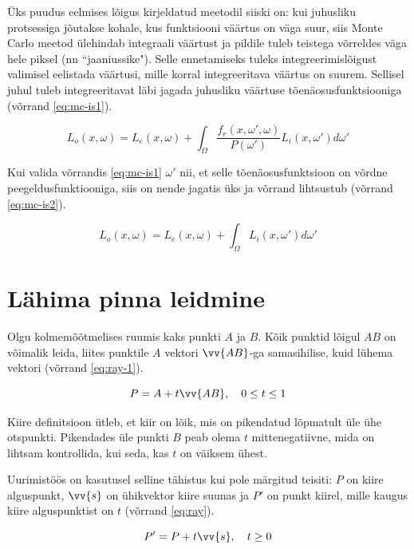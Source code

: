 \documentclass[a4paper,12pt]{report}
\renewcommand{\vec}[1]{\vv{#1}}
\begin{document}
Üks puudus eelmises lõigus kirjeldatud meetodil siiski on: kui juhusliku
protsessiga jõutakse kohale, kus funktsiooni väärtus on väga suur, siis
Monte Carlo meetod ülehindab integraali väärtust ja pildile tuleb teistega
võrreldes väga hele piksel (nn ``jaaniussike"). Selle ennetamiseks tuleks
integreerimislõigust valimisel eelistada väärtusi, mille korral
integreeritava väärtus on suurem. Sellisel juhul tuleb integreeritavat
läbi jagada juhusliku väärtuse tõenäosusfunktsiooniga (võrrand \ref{eq:mc-is1}).

\begin{equation} \label{eq:mc-is1}
L_o(x, \omega) = L_e(x, \omega) + \int_\Omega \frac{f_r(x, \omega', \omega)}{P(\omega')} L_i(x, \omega') d\omega'
\end{equation}

Kui valida võrrandis \ref{eq:mc-is1} \(\omega'\) nii, et selle
tõenäosusfunktsioon on võrdne peegeldusfunktiooniga, siis on nende
jagatis üks ja võrrand lihtsustub (võrrand \ref{eq:mc-is2}).

\begin{equation} \label{eq:mc-is2}
L_o(x, \omega) = L_e(x, \omega) + \int_\Omega L_i(x, \omega') d\omega'
\end{equation}

\section{Lähima pinna leidmine}
Olgu kolmemõõtmelises ruumis kaks punkti \(A\) ja \(B\). Kõik punktid
lõigul \(AB\) on võimalik leida, liites punktile \(A\) vektori \(\vec{AB}\)-ga
samasihilise, kuid lühema vektori (võrrand \ref{eq:ray-1}).

\begin{equation} \label{eq:ray-1}
P = A + t\vec{AB}, \quad 0 \leq t \leq 1
\end{equation}

Kiire definitsioon ütleb, et kiir on lõik, mis on pikendatud lõpmatult
üle ühe otspunkti. Pikendades üle punkti \(B\) peab olema \(t\)
mittenegatiivne, mida on lihtsam kontrollida, kui seda, kas \(t\) on
väiksem ühest.

Uurimistöös on kasutusel selline tähistus kui pole märgitud teisiti:
\(P\) on kiire alguspunkt, \(\vec s\) on ühikvektor kiire suunas ja
\(P'\) on punkt kiirel, mille kaugus kiire alguspunktist on \(t\)
(võrrand \ref{eq:ray}).

\begin{equation} \label{eq:ray}
P' = P + t\vec s, \quad t \geq 0
\end{equation}
\end{document}
